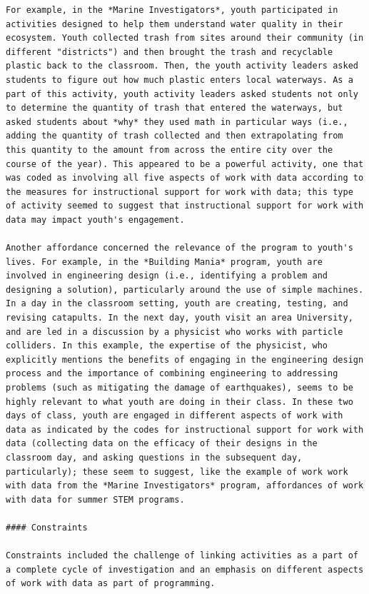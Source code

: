 \documentclass[]{book}
\theoremstyle{definition}
\theoremstyle{definition}
\theoremstyle{definition}
\theoremstyle{remark}
\begin{document}
\begin{verbatim}
For example, in the *Marine Investigators*, youth participated in activities designed to help them understand water quality in their ecosystem. Youth collected trash from sites around their community (in different "districts") and then brought the trash and recyclable plastic back to the classroom. Then, the youth activity leaders asked students to figure out how much plastic enters local waterways. As a part of this activity, youth activity leaders asked students not only to determine the quantity of trash that entered the waterways, but asked students about *why* they used math in particular ways (i.e., adding the quantity of trash collected and then extrapolating from this quantity to the amount from across the entire city over the course of the year). This appeared to be a powerful activity, one that was coded as involving all five aspects of work with data according to the measures for instructional support for work with data; this type of activity seemed to suggest that instructional support for work with data may impact youth's engagement.

Another affordance concerned the relevance of the program to youth's lives. For example, in the *Building Mania* program, youth are involved in engineering design (i.e., identifying a problem and designing a solution), particularly around the use of simple machines. In a day in the classroom setting, youth are creating, testing, and revising catapults. In the next day, youth visit an area University, and are led in a discussion by a physicist who works with particle colliders. In this example, the expertise of the physicist, who explicitly mentions the benefits of engaging in the engineering design process and the importance of combining engineering to addressing problems (such as mitigating the damage of earthquakes), seems to be highly relevant to what youth are doing in their class. In these two days of class, youth are engaged in different aspects of work with data as indicated by the codes for instructional support for work with data (collecting data on the efficacy of their designs in the classroom day, and asking questions in the subsequent day, particularly); these seem to suggest, like the example of work work with data from the *Marine Investigators* program, affordances of work with data for summer STEM programs.

#### Constraints

Constraints included the challenge of linking activities as a part of a complete cycle of investigation and an emphasis on different aspects of work with data as part of programming.


\end{verbatim}
\end{document}
